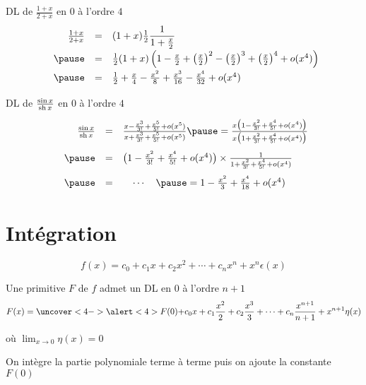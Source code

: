 \begin{frame}

\begin{exemple}
DL de $\frac{1+x}{2+x}$ en $0$ à l'ordre $4$
\vspace*{-2ex}
\pause
$$\begin{array}{rcl@{\vrule depth 1.2ex height 3ex width 0mm }}
\frac{1+x}{2+x}  
  & = & \displaystyle (1+x)\tfrac12\frac{1}{1+\frac{x}{2}} \\ \pause
  & = & \frac12(1+x) \left( 1-\frac{x}{2}+\left(\frac{x}{2}\right)^2-\left(\frac{x}{2}\right)^3
+\left( \frac{x}{2} \right)^4 + o(x^4) \right) \\ \pause
  & = & \frac12+\frac{x}{4}-\frac{x^2}{8}+\frac{x^3}{16}-\frac{x^4}{32} + o(x^4) \\
\end{array}$$
\end{exemple}


\pause

\begin{exemple}
DL de $\frac{\sin x}{\mathop{\text{sh}}\nolimits x}$ en $0$ à l'ordre $4$
\vspace*{-3ex}
\pause
$$\begin{array}{rcl@{\vrule depth 1.2ex height 4ex width 0mm }}
\frac{\sin x}{\sh x} 
  & = & \frac{x-\frac{x^3}{3!} + \frac{x^5}{5!}+ o(x^5)}{x+\frac{x^3}{3!} + \frac{x^5}{5!} + o(x^5)}  \pause
   =  \frac{x\big(1-\frac{x^2}{3!} + \frac{x^4}{5!}+ o(x^4)\big)}{x\big(1+\frac{x^2}{3!}+ \frac{x^4}{5!} + o(x^4)\big)} \\ \pause
  & = & \big(1-\frac{x^2}{3!}  + \frac{x^4}{5!}+ o(x^4)\big) \times \frac{1}{1+\frac{x^2}{3!}+ \frac{x^4}{5!} + o(x^4)} \\ \pause
  & = & \quad \cdots \quad \pause =  1-\frac{x^2}{3}+\frac{x^4}{18} + o(x^4) \\
\end{array}
$$
\end{exemple}

\end{frame}

\section{Intégration}

\begin{frame}

$$f(x)=c_0+c_1x+c_2x^2+\cdots+c_nx^n+x^n\epsilon(x)$$

\pause

\begin{theoreme}
Une primitive $F$ de $f$ admet un DL en $0$ à l'ordre $n+1$
\pause
$$F(x)= \uncover<4->{\alert<4>{F(0)}+}c_0 x+c_1\frac{x^2}{2}+ c_2\frac{x^3}{3}+\cdots+c_n\frac{x^{n+1}}{n+1} 
+x^{n+1}\eta(x)$$

où $\displaystyle\lim_{x\to 0}\eta(x)=0$
\end{theoreme}
\pause  
\pause

On intègre la partie polynomiale terme à terme 
puis on ajoute la constante $F(0)$

\end{frame}


